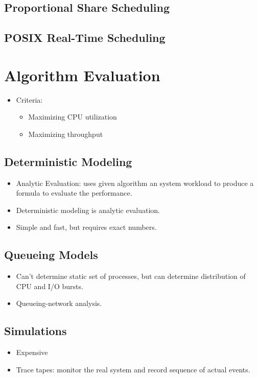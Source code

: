 \documentclass[10pt]{report}
\begin{document}
		\subsection{Proportional Share Scheduling}

		\subsection{POSIX Real-Time Scheduling}


	\section{Algorithm Evaluation}
		\begin{itemize}
			\item Criteria:
			\begin{itemize}
				\item Maximizing CPU utilization
				\item Maximizing throughput
			\end{itemize}
		\end{itemize}

		\subsection{Deterministic Modeling}
			\begin{itemize}
				\item Analytic Evaluation: uses given algorithm an system workload to produce a formula to evaluate the performance.
				\item Deterministic modeling is analytic evaluation.
				\item Simple and fast, but requires exact numbers.
			\end{itemize}

		\subsection{Queueing Models}
			\begin{itemize}
				\item Can't determine static set of processes, but can determine distribution of CPU and I/O bursts.
				\item Queueing-network analysis.
			\end{itemize}

		\subsection{Simulations}
			\begin{itemize}
				\item Expensive
				\item Trace tapes: monitor the real system and record sequence of actual events.
			\end{itemize}
\end{document}

